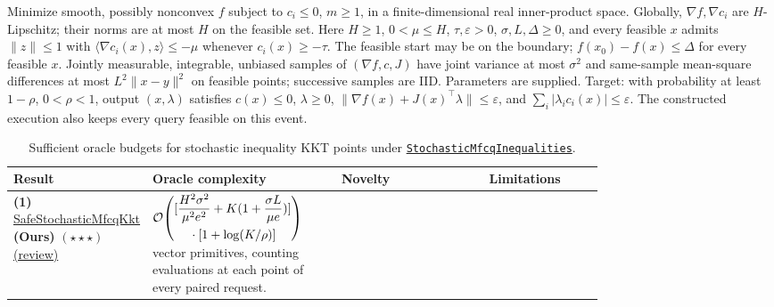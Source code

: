\begin{table}[tp]
\centering
\caption{Sufficient oracle budgets for stochastic inequality KKT points under \href{https://github.com/k3nfalt/longtails/blob/main/LongTails/Setups/StochasticMfcqInequalities.lean}{\texttt{StochasticMfcqInequalities}}.}\label{tab:StochasticMfcqInequalities}
\parbox{\linewidth}{\footnotesize
Minimize smooth, possibly nonconvex $f$ subject to $c_i\leq0$, $m\geq1$, in a finite-dimensional real inner-product space. Globally, $\nabla f,\nabla c_i$ are $H$-Lipschitz; their norms are at most $H$ on the feasible set. Here $H\geq1$, $0<\mu\leq H$, $\tau,\varepsilon>0$, $\sigma,L,\Delta\geq0$, and every feasible $x$ admits $\|z\|\leq1$ with $\langle\nabla c_i(x),z\rangle\leq-\mu$ whenever $c_i(x)\geq-\tau$. The feasible start may be on the boundary; $f(x_0)-f(x)\leq\Delta$ for every feasible $x$. Jointly measurable, integrable, unbiased samples of $(\nabla f,c,J)$ have joint variance at most $\sigma^2$ and same-sample mean-square differences at most $L^2\|x-y\|^2$ on feasible points; successive samples are IID. Parameters are supplied. Target: with probability at least $1-\rho$, $0<\rho<1$, output $(x,\lambda)$ satisfies $c(x)\leq0$, $\lambda\geq0$, $\|\nabla f(x)+J(x)^\top\lambda\|\leq\varepsilon$, and $\sum_i|\lambda_i c_i(x)|\leq\varepsilon$. The constructed execution also keeps every query feasible on this event.
}\par\smallskip
\begin{threeparttable}
\footnotesize
\setlength{\tabcolsep}{4pt}\renewcommand{\arraystretch}{1.25}
\begin{tabularx}{\linewidth}{@{}>{\raggedright\arraybackslash}p{0.20\linewidth}>{\raggedright\arraybackslash}p{0.32\linewidth}>{\raggedright\arraybackslash}p{0.25\linewidth}>{\raggedright\arraybackslash}X@{}}
\toprule
\textbf{Result} & \textbf{Oracle complexity} & \textbf{Novelty} & \textbf{Limitations} \\
\midrule
\textbf{(1)} \href{https://github.com/k3nfalt/longtails/blob/main/LongTails/Theorems/SafeStochasticMfcqKkt.lean}{Safe\allowbreak Stochastic\allowbreak Mfcq\allowbreak Kkt} \textbf{(Ours)} $(\star\star\star)$ \href{https://github.com/k3nfalt/longtails/blob/main/scripts/reviews/SafeStochasticMfcqKkt.md}{(review)}
& $\mathcal{O}\!\left(\begin{gathered}\relax[\frac{H^2\sigma^2}{\mu^2e^2}+K(1+\frac{\sigma L}{\mu e})]\\ {}\cdot[1+\log(K/\rho)]\end{gathered}\right)$ vector primitives, counting evaluations at each point of every paired request.

\end{tabularx}
\end{threeparttable}
\end{table}
